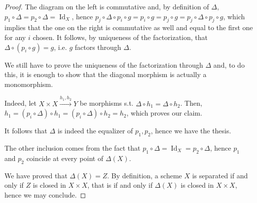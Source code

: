 \documentclass{article}
\newcommand{\exercise}[1]{\noindent {\bf Exercise #1}}
\DeclareMathOperator{\Id}{Id}
\begin{document}
\begin{proof}
    The diagram on the left is commutative and, by definition of $\Delta$,
    $p_1\circ\Delta=p_2\circ\Delta=\Id_X$, hence $p_j\circ\Delta\circ p_i\circ
    g=p_i\circ g=p_j\circ g=p_j\circ\Delta\circ p_j\circ g$, which implies that
    the one on
    the right is commutative as well and equal to the first one for any $i$
    chosen. It follows, by uniqueness of the factorization, that $\Delta\circ
    (p_i\circ g)=g$, i.e. $g$ factors through $\Delta$.

    We still have to prove the uniqueness of the factorization through $\Delta$
    and, to do this, it is enough to show that the diagonal morphism is
    actually a monomorphism.

    Indeed, let $X\times X\xrightarrow{h_1,h_2}Y$ be morphisms s.t.
    $\Delta\circ h_1=\Delta\circ h_2$. Then, $h_1=(p_i\circ\Delta)\circ h_1=
    (p_i\circ\Delta)\circ h_2=h_2$, which proves our claim.

    It follows that $\Delta$ is indeed the equalizer of $p_1,p_2$, hence we have
    the thesis.
    
    The other inclusion comes from the fact that
    $p_1\circ\Delta=\Id_X=p_2\circ\Delta$, hence $p_1$ and $p_2$ coincide at
    every point of $\Delta(X)$.

    We have proved that $\Delta(X)=Z$. By definition, a scheme $X$ is separated
    if and only if $Z$ is closed in $X\times X$, that is if and only if
    $\Delta(X)$ is closed in $X\times X$, hence we may conclude.
\end{proof}


~\\
\exercise{2}
\end{document}
